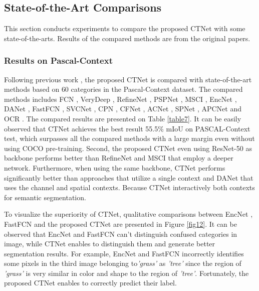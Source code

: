 \documentclass[10pt,journal,cspaper,compsoc]{IEEEtran}
\begin{document}
	
\subsection{State-of-the-Art Comparisons}
This section conducts experiments to compare the proposed CTNet with some state-of-the-arts. Results of the compared methods are from the original papers.
	
\subsubsection{Results on Pascal-Context}
Following previous work \cite{yuan2020object, ding2019acnet}, the proposed CTNet is compared with state-of-the-art methods based on $60$ categories in the Pascal-Context dataset. The compared methods includes FCN \cite{shelhamer2017fully}, VeryDeep \cite{wang2017learning}, RefineNet \cite{lin2017refinenet}, PSPNet \cite{zhao2017pyramid}, MSCI \cite{lin2018multi}, EncNet \cite{zhang2018context}, DANet \cite{fu2019dual}, FastFCN \cite{wu2019fastfcn}, SVCNet \cite{ding2019semantic}, CPN \cite{yu2020context}, CFNet \cite{zhang2019co}, ACNet \cite{ding2019acnet}, SPNet \cite{hou2020strip}, APCNet \cite{he2019adaptive} and OCR \cite{yuan2020object}. The compared results are presented on Table \ref{table7}. It can be easily observed that CTNet achieves the best result 55.5\% mIoU on PASCAL-Context test, which surpasses all the compared methods with a large margin even without using COCO pre-training. Second, the proposed CTNet even using ResNet-50 as backbone performs better than RefineNet \cite{lin2017refinenet} and MSCI \cite{lin2018multi} that employ a deeper network. Furthermore, when using the same backbone, CTNet performs significantly better than approaches that utilize a single context and DANet that uses the channel and spatial contexts. Because CTNet interactively both contexts for semantic segmentation.

To visualize the superiority of CTNet, qualitative comparisons between EncNet \cite{zhang2018context}, FastFCN \cite{wu2019fastfcn} and the proposed CTNet are presented in Figure \ref{fig12}. It can be observed that EncNet and FastFCN can't distinguish confused categories in image, while CTNet enables to distinguish them and generate better segmentation results. For example, EncNet and FastFCN incorrectly identifies some pixels in the third image belonging to\textit{'grass'} as \textit{'tree'} since the region of \textit{'grass'} is very similar in color and shape to the region of \textit{'tree'}. Fortunately, the proposed CTNet enables to correctly predict their label.
	
\end{document}
